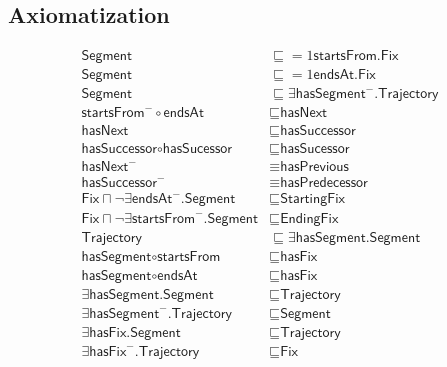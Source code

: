 \subsection{Axiomatization}
\label{axs:Trajectory}
\begin{align}
\textsf{Segment} &\sqsubseteq \mathord{=1}\textsf{startsFrom.Fix}\\
\textsf{Segment} &\sqsubseteq \mathord{=1}\textsf{endsAt.Fix} \\
\textsf{Segment} &\sqsubseteq \exists \textsf{hasSegment}^-\textsf{.Trajectory} \\
\textsf{startsFrom}^- \circ \textsf{endsAt} &\sqsubseteq \textsf{hasNext} \\
\textsf{hasNext} &\sqsubseteq \textsf{hasSuccessor} \\
\textsf{hasSuccessor} \circ \textsf{hasSucessor} &\sqsubseteq \textsf{hasSucessor} \\
\textsf{hasNext}^- &\equiv \textsf{hasPrevious} \\
\textsf{hasSuccessor}^- &\equiv \textsf{hasPredecessor} \\
\textsf{Fix} \sqcap \lnot\exists\textsf{endsAt}^-\textsf{.Segment} &\sqsubseteq \textsf{StartingFix} \\
\textsf{Fix} \sqcap \lnot\exists\textsf{startsFrom}^-\textsf{.Segment} &\sqsubseteq \textsf{EndingFix} \\
\textsf{Trajectory} &\sqsubseteq \exists\textsf{hasSegment.Segment} \\
\textsf{hasSegment} \circ \textsf{startsFrom} &\sqsubseteq \textsf{hasFix} \\
\textsf{hasSegment} \circ \textsf{endsAt} &\sqsubseteq \textsf{hasFix} \\
\exists \textsf{hasSegment.Segment} &\sqsubseteq \textsf{Trajectory} \\
\exists \textsf{hasSegment}^-\textsf{.Trajectory} &\sqsubseteq \textsf{Segment} \\
\exists \textsf{hasFix.Segment} &\sqsubseteq \textsf{Trajectory} \\
\exists \textsf{hasFix}^-\textsf{.Trajectory} &\sqsubseteq \textsf{Fix}
\end{align}

